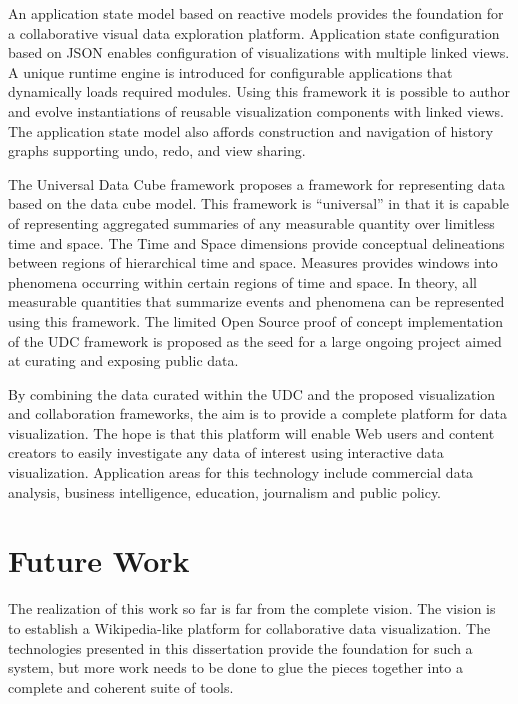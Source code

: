 An application state model based on reactive models provides the foundation for a collaborative visual data exploration platform. Application state configuration based on JSON enables configuration of visualizations with multiple linked views. A unique runtime engine is introduced for configurable applications that dynamically loads required modules. Using this framework it is possible to author and evolve instantiations of reusable visualization components with linked views. The application state model also affords construction and navigation of history graphs supporting undo, redo, and view sharing.

The Universal Data Cube framework proposes a framework for representing data based on the data cube model. This framework is ``universal'' in that it is capable of representing aggregated summaries of any measurable quantity over limitless time and space. The Time and Space dimensions provide conceptual delineations between regions of hierarchical time and space. Measures provides windows into phenomena occurring within certain regions of time and space. In theory, all measurable quantities that summarize events and phenomena can be represented using this framework. The limited Open Source proof of concept implementation of the UDC framework is proposed as the seed for a large ongoing project aimed at curating and exposing public data.

By combining the data curated within the UDC and the proposed visualization and collaboration frameworks, the aim is to provide a complete platform for data visualization. The hope is that this platform will enable Web users and content creators to easily investigate any data of interest using interactive data visualization. Application areas for this technology include commercial data analysis, business intelligence, education, journalism and public policy.


\section{Future Work}
The realization of this work so far is far from the complete vision. The vision is to establish a Wikipedia-like platform for collaborative data visualization. The technologies presented in this dissertation provide the foundation for such a system, but more work needs to be done to glue the pieces together into a complete and coherent suite of tools.

